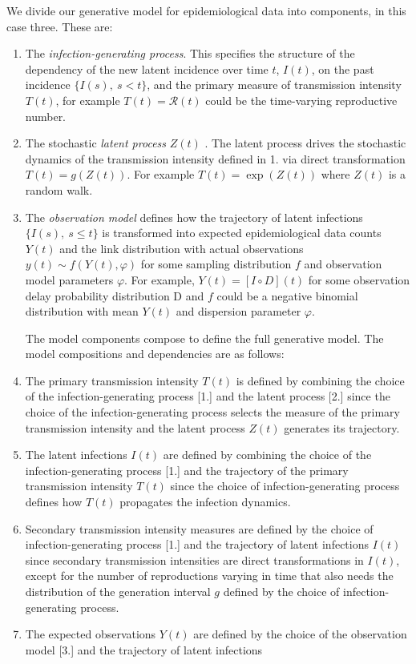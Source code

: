\documentclass{getwriting}
\begin{document}
We divide our generative model for epidemiological data into components\cite{bjornstad2022epidemics}, in this case three. These are:
\begin{enumerate}
    \item The \textit{infection-generating process}. This specifies the structure of the dependency of the new latent incidence over time $t$, $I(t)$, on the past incidence $\{I(s),~s < t\}$, and the primary measure of transmission intensity $T(t)$, for example $T(t)=\mathcal{R}(t)$ could be the time-varying reproductive number.
    \item The stochastic \textit{latent process} $Z(t)$ . The latent process drives the stochastic dynamics of the transmission intensity defined in 1. via direct transformation $T(t) = g(Z(t))$. For example $T(t) = \exp(Z(t))$ where $Z(t)$ is a random walk. 
    \item  The \textit{observation model} defines how the trajectory of latent infections $\{I(s),~s \leq t\}$ is transformed into expected epidemiological data counts $Y(t)$ and the link distribution with actual observations $y(t) \sim f(Y(t), \varphi)$ for some sampling distribution $f$ and observation model parameters $\varphi$. For example, $Y(t) = [I \circ D](t)$ for some observation delay probability distribution D and $f$ could be a negative binomial distribution with mean $Y(t)$ and dispersion parameter $\varphi$.

The model components compose to define the full generative model. The model compositions and dependencies are as follows:

    \item The primary transmission intensity $T(t)$ is defined by combining the choice of the infection-generating process [1.] and the latent process [2.] since the choice of the infection-generating process selects the measure of the primary transmission intensity and the latent process $Z(t)$ generates its trajectory.
    \item The latent infections $I(t)$ are defined by combining the choice of the infection-generating process [1.] and the trajectory of the primary transmission intensity $T(t)$ since the choice of infection-generating process defines how $T(t)$ propagates the infection dynamics.
    \item Secondary transmission intensity measures are defined by the choice of infection-generating process [1.] and the trajectory of latent infections $I(t)$ since secondary transmission intensities are direct transformations in $I(t)$, except for the number of reproductions varying in time that also needs the distribution of the generation interval $g$ defined by the choice of infection-generating process.
    \item The expected observations $Y(t)$ are defined by the choice of the observation model [3.] and the trajectory of latent infections
\end{enumerate}
\end{document}
